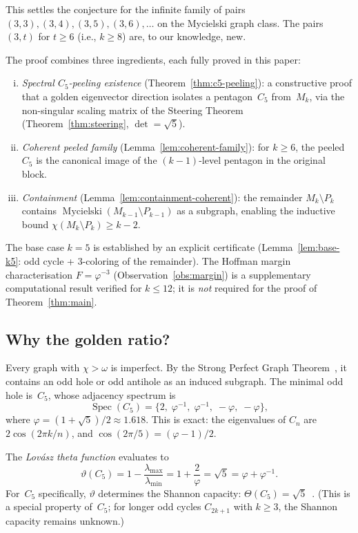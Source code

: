 \documentclass[11pt,a4paper]{amsart}
\theoremstyle{plain}
\theoremstyle{definition}
\theoremstyle{remark}
\newcommand{\vp}{\varphi}
\newcommand{\myc}{\operatorname{Mycielski}}
\newcommand{\chr}{\chi}
\newcommand{\om}{\omega}
\newcommand{\Spec}{\operatorname{Spec}}
\begin{document}
This settles the conjecture for the infinite family of pairs
$(3,3),(3,4),(3,5),(3,6),\ldots$ on the Mycielski graph class.  The pairs
$(3,t)$ for $t \geq 6$ (i.e., $k\geq 8$) are, to our knowledge, new.

The proof combines three ingredients, each fully proved in this paper:
\begin{enumerate}[(i)]
\item \emph{Spectral $C_5$-peeling existence} (Theorem~\ref{thm:c5-peeling}): a
  constructive proof that a golden eigenvector direction isolates a
  pentagon~$C_5$ from~$M_k$, via the non-singular scaling matrix of the
  Steering Theorem (Theorem~\ref{thm:steering}, $\det = \sqrt{5}$).
\item \emph{Coherent peeled family} (Lemma~\ref{lem:coherent-family}): for
  $k\geq 6$, the peeled~$C_5$ is the canonical image of the $(k{-}1)$-level
  pentagon in the original block.
\item \emph{Containment} (Lemma~\ref{lem:containment-coherent}): the remainder
  $M_k \setminus P_k$ contains $\myc(M_{k-1}\setminus P_{k-1})$ as a subgraph,
  enabling the inductive bound $\chr(M_k\setminus P_k)\geq k-2$.
\end{enumerate}
The base case $k = 5$ is established by an explicit certificate
(Lemma~\ref{lem:base-k5}: odd cycle + $3$-coloring of the remainder).  The Hoffman margin
characterisation $F = \vp^{-3}$ (Observation~\ref{obs:margin}) is a supplementary
computational result verified for $k \leq 12$; it is \emph{not} required for
the proof of Theorem~\ref{thm:main}.

\subsection{Why the golden ratio?}\label{ssec:why-golden}

Every graph with $\chr > \om$ is imperfect.  By the Strong Perfect Graph
Theorem~\cite{chudnovsky2006}, it contains an odd hole or odd antihole as an
induced subgraph.  The minimal odd hole is~$C_5$, whose adjacency spectrum is
\begin{equation}\label{eq:spec-c5}
  \Spec(C_5) = \bigl\{2,\;\vp^{-1},\;\vp^{-1},\;-\vp,\;-\vp\bigr\},
\end{equation}
where $\vp = (1+\sqrt{5})/2 \approx 1.618$.  This is exact: the eigenvalues of
$C_n$ are $2\cos(2\pi k/n)$, and $\cos(2\pi/5) = (\vp - 1)/2$.

The \emph{Lov\'asz theta function} evaluates to
\[
  \vartheta(C_5)
  = 1 - \frac{\lambda_{\max}}{\lambda_{\min}}
  = 1 + \frac{2}{\vp}
  = \sqrt{5}
  = \vp + \vp^{-1}.
\]
For~$C_5$ specifically, $\vartheta$ determines the Shannon capacity:
$\Theta(C_5) = \sqrt{5}$~\cite{lovasz1979}.  (This is a special property
of~$C_5$; for longer odd cycles $C_{2k+1}$ with $k\geq 3$, the Shannon
capacity remains unknown.)
\end{document}
